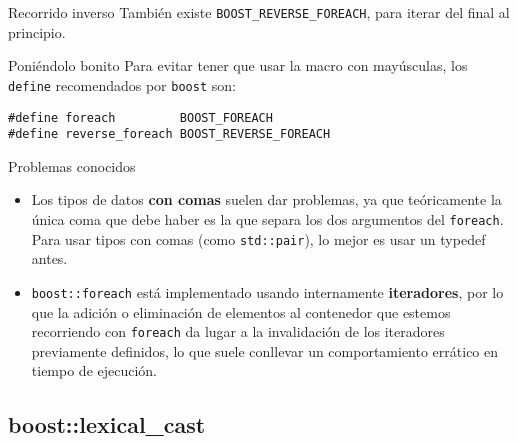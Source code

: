 \documentclass[8pt,xcolor=svgnames]{beamer}
\begin{document}
\begin{frame}[fragile]{}
  \begin{block}{Recorrido inverso}
    También existe \texttt{BOOST\_REVERSE\_FOREACH}, para iterar del
    final al principio.
  \end{block}
  \pause
  \begin{block}{Poniéndolo bonito}
    Para evitar tener que usar la macro con mayúsculas, los \texttt{define} recomendados por \texttt{boost} son:
\begin{verbatim}
#define foreach         BOOST_FOREACH
#define reverse_foreach BOOST_REVERSE_FOREACH
\end{verbatim}
  \end{block}
  \pause
  \begin{block}{Problemas conocidos}
    \begin{itemize}
    \item Los tipos de datos \textbf{con comas} suelen dar problemas,
      ya que teóricamente la única coma que debe haber es la que
      separa los dos argumentos del \texttt{foreach}. Para usar tipos
      con comas (como \texttt{std::pair}), lo mejor es usar un typedef
      antes.
    \item \texttt{boost::foreach} está implementado usando
      internamente \textbf{iteradores}, por lo que la adición o
      eliminación de elementos al contenedor que estemos recorriendo
      con \texttt{foreach} da lugar a la invalidación de los
      iteradores previamente definidos, lo que suele conllevar un
      comportamiento errático en tiempo de ejecución.
    \end{itemize}
  \end{block}
\end{frame}

\subsection{boost::lexical\_cast}
\end{document}
